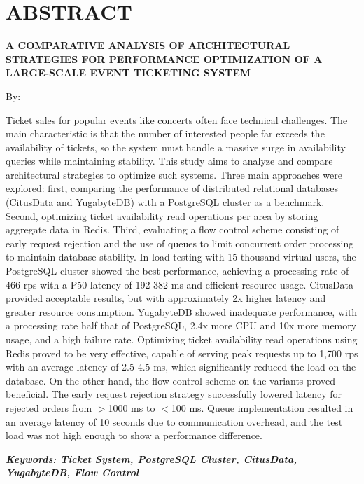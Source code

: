 \clearpage
\chapter*{ABSTRACT}

\begin{center}
    \center
    \begin{singlespace}
        \large\bfseries\MakeUppercase{A Comparative Analysis of Architectural Strategies for Performance Optimization of a Large-Scale Event Ticketing System}

        \normalfont\normalsize
        By:

        \bfseries \theauthor
    \end{singlespace}
\end{center}


\begin{singlespace}
    \small
    Ticket sales for popular events like concerts often face technical challenges. The main characteristic is that the number of interested people far exceeds the availability of tickets, so the system must handle a massive surge in availability queries while maintaining stability. This study aims to analyze and compare architectural strategies to optimize such systems. Three main approaches were explored: first, comparing the performance of distributed relational databases (CitusData and YugabyteDB) with a PostgreSQL cluster as a benchmark. Second, optimizing ticket availability read operations per area by storing aggregate data in Redis. Third, evaluating a flow control scheme consisting of early request rejection and the use of queues to limit concurrent order processing to maintain database stability. In load testing with 15 thousand virtual users, the PostgreSQL cluster showed the best performance, achieving a processing rate of 466 rps with a P50 latency of 192-382 ms and efficient resource usage. CitusData provided acceptable results, but with approximately 2x higher latency and greater resource consumption. YugabyteDB showed inadequate performance, with a processing rate half that of PostgreSQL, 2.4x more CPU and 10x more memory usage, and a high failure rate. Optimizing ticket availability read operations using Redis proved to be very effective, capable of serving peak requests up to 1,700 rps with an average latency of 2.5-4.5 ms, which significantly reduced the load on the database. On the other hand, the flow control scheme on the variants proved beneficial. The early request rejection strategy successfully lowered latency for rejected orders from $>$1000 ms to $<$100 ms. Queue implementation resulted in an average latency of 10 seconds due to communication overhead, and the test load was not high enough to show a performance difference.

    \textbf{\textit{Keywords: Ticket System, PostgreSQL Cluster, CitusData, YugabyteDB, Flow Control}}
\end{singlespace}
\clearpage

\clearpage
